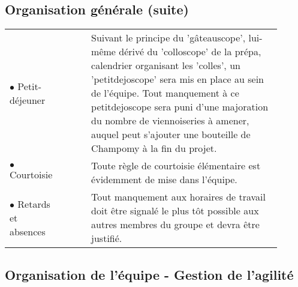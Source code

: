 \documentclass[a4paper,11pt]{article}
\begin{document}
\begin{spacing}{1.3}
\begin{tabular}{p{0.2\linewidth}  p{0.005\linewidth} p{0.7\linewidth} }
		\end{tabular}

		\subsection*{Organisation générale (suite)}

		\begin{tabular}{p{0.2\linewidth} p{0.005\linewidth} p{0.7\linewidth} }
		$\bullet$ Petit-déjeuner & & Suivant le principe du 'gâteauscope', lui-même dérivé du 'colloscope' de la prépa, calendrier organisant les 'colles', un 'petitdejoscope' sera mis en place au sein de l'équipe. Tout manquement à ce petitdejoscope sera puni d'une majoration du nombre de viennoiseries à amener, auquel peut s'ajouter une bouteille de Champomy à la fin du projet.\\[0.3cm]
		$\bullet$ Courtoisie & & Toute règle de courtoisie élémentaire est évidemment de mise dans l'équipe.\\[0.3cm]
		$\bullet$ Retards et absences & & Tout manquement aux horaires de travail doit être signalé le plus tôt possible aux autres membres du groupe et devra être justifié.\\[0.3cm]
		\end{tabular}
		

                \subsection*{Organisation de l'équipe - Gestion de l'agilité}


\end{spacing}
\end{document}
